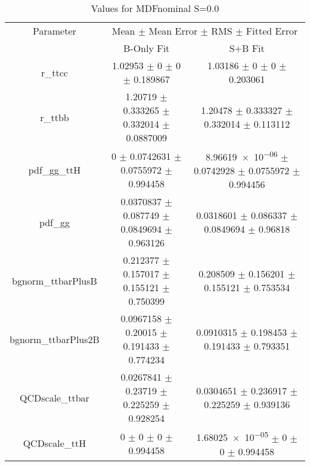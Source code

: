 \begin{table}
\centering
\caption{Values for MDFnominal S=0.0}
\begin{tabular}{ccc}
\toprule
Parameter & \multicolumn{2}{c}{Mean $\pm$ Mean Error $\pm$ RMS $\pm$ Fitted Error}\\
 & B-Only Fit & S+B Fit\\
\midrule
r\_ttcc & \num{1.02953} $\pm$ \num{0} $\pm$ \num{0} $\pm$ \num{0.189867} & \num{1.03186} $\pm$ \num{0} $\pm$ \num{0} $\pm$ \num{0.203061}\\
r\_ttbb & \num{1.20719} $\pm$ \num{0.333265} $\pm$ \num{0.332014} $\pm$ \num{0.0887009} & \num{1.20478} $\pm$ \num{0.333327} $\pm$ \num{0.332014} $\pm$ \num{0.113112}\\
pdf\_gg\_ttH & \num{0} $\pm$ \num{0.0742631} $\pm$ \num{0.0755972} $\pm$ \num{0.994458} & \num{8.96619e-06} $\pm$ \num{0.0742928} $\pm$ \num{0.0755972} $\pm$ \num{0.994456}\\
pdf\_gg & \num{0.0370837} $\pm$ \num{0.087749} $\pm$ \num{0.0849694} $\pm$ \num{0.963126} & \num{0.0318601} $\pm$ \num{0.086337} $\pm$ \num{0.0849694} $\pm$ \num{0.96818}\\
bgnorm\_ttbarPlusB & \num{0.212377} $\pm$ \num{0.157017} $\pm$ \num{0.155121} $\pm$ \num{0.750399} & \num{0.208509} $\pm$ \num{0.156201} $\pm$ \num{0.155121} $\pm$ \num{0.753534}\\
bgnorm\_ttbarPlus2B & \num{0.0967158} $\pm$ \num{0.20015} $\pm$ \num{0.191433} $\pm$ \num{0.774234} & \num{0.0910315} $\pm$ \num{0.198453} $\pm$ \num{0.191433} $\pm$ \num{0.793351}\\
QCDscale\_ttbar & \num{0.0267841} $\pm$ \num{0.23719} $\pm$ \num{0.225259} $\pm$ \num{0.928254} & \num{0.0304651} $\pm$ \num{0.236917} $\pm$ \num{0.225259} $\pm$ \num{0.939136}\\
QCDscale\_ttH & \num{0} $\pm$ \num{0} $\pm$ \num{0} $\pm$ \num{0.994458} & \num{1.68025e-05} $\pm$ \num{0} $\pm$ \num{0} $\pm$ \num{0.994458}\\
\bottomrule
\end{tabular}
\end{table}